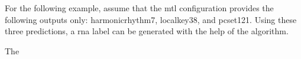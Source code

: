 
For the following example, assume that the \gls{mtl}
configuration provides the following outputs only:
\gls{harmonicrhythm7}, \gls{localkey38}, and \gls{pcset121}.
Using these three predictions, a \gls{rna} label can be
generated with the help of the \algorithmrn{} algorithm.

The 
